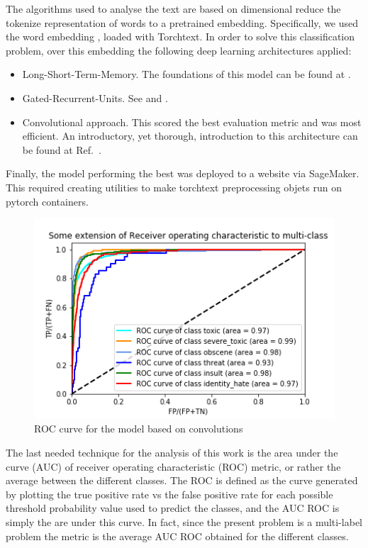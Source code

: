 \documentclass{report}
\begin{document}
The algorithms used to analyse the text are based 
on dimensional reduce the tokenize representation of words to a pretrained embedding. Specifically, 
we used the word embedding \cite{Glove},
loaded with Torchtext. In order to solve this classification problem,  over this embedding the following deep learning 
architectures applied:
\begin{itemize}
\item Long-Short-Term-Memory.  The foundations of this model can be found at \cite{NG}.
\item Gated-Recurrent-Units.  See \cite{NG} and \cite{Udacity}.
\item Convolutional approach. This scored the best evaluation metric
and was most efficient. An introductory, yet thorough, introduction to this
architecture can be found at Ref.~\cite{BT}.
\end{itemize}
Finally, the model performing the best was deployed to a website via SageMaker. This required creating utilities to make 
torchtext preprocessing objets run on pytorch containers. 

\begin{figure}[!h]
\centering
  \includegraphics[width=120mm]{../local/plots_tables/rocs.png}
  \caption{ROC curve for the model based on convolutions}
  \label{fig:rocs}
\end{figure}

The last needed technique for the analysis of this work is the 
area under the curve (AUC) of receiver operating characteristic (ROC)
 metric, or rather the average between the different classes. The ROC is defined 
 as the curve generated by plotting the true positive rate  vs the false positive rate 
 for each possible threshold probability value used to predict the classes, and the AUC
 ROC is simply the are under this curve. In fact, since the present problem is a multi-label
 problem the metric is the average AUC ROC obtained for the different classes. 
 
\end{document}
